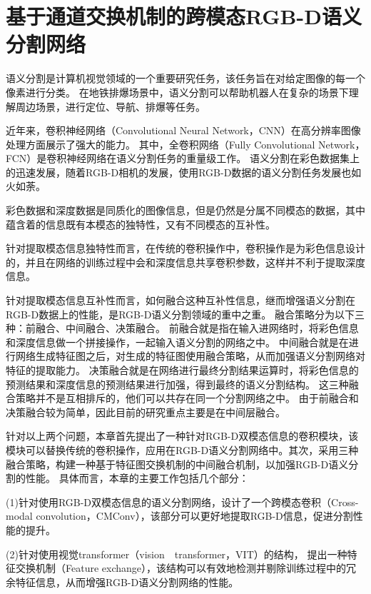 \chapter{基于通道交换机制的跨模态RGB-D语义分割网络}
语义分割是计算机视觉领域的一个重要研究任务，该任务旨在对给定图像的每一个像素进行分类。
在地铁排爆场景中，语义分割可以帮助机器人在复杂的场景下理解周边场景，进行定位、导航、排爆等任务。

近年来，卷积神经网络（Convolutional Neural Network，CNN）在高分辨率图像处理方面展示了强大的能力。
其中，全卷积网络（Fully Convolutional Network，FCN）是卷积神经网络在语义分割任务的重量级工作。
语义分割在彩色数据集上的迅速发展，随着RGB-D相机的发展，使用RGB-D数据的语义分割任务发展也如火如荼。

彩色数据和深度数据是同质化的图像信息，但是仍然是分属不同模态的数据，其中蕴含着的信息既有本模态的独特性，又有不同模态的互补性。

针对提取模态信息独特性而言，在传统的卷积操作中，卷积操作是为彩色信息设计的，并且在网络的训练过程中会和深度信息共享卷积参数，这样并不利于提取深度信息。

针对提取模态信息互补性而言，如何融合这种互补性信息，继而增强语义分割在RGB-D数据上的性能，是RGB-D语义分割领域的重中之重。
融合策略分为以下三种：前融合、中间融合、决策融合。
前融合就是指在输入进网络时，将彩色信息和深度信息做一个拼接操作，一起输入语义分割的网络之中。
中间融合就是在进行网络生成特征图之后，对生成的特征图使用融合策略，从而加强语义分割网络对特征的提取能力。
决策融合就是在网络进行最终分割结果运算时，将彩色信息的预测结果和深度信息的预测结果进行加强，得到最终的语义分割结构。
这三种融合策略并不是互相排斥的，他们可以共存在同一个分割网络之中。
由于前融合和决策融合较为简单，因此目前的研究重点主要是在中间层融合。

针对以上两个问题，本章首先提出了一种针对RGB-D双模态信息的卷积模块，该模块可以替换传统的卷积操作，应用在RGB-D语义分割网络中。其次，采用三种融合策略，构建一种基于特征图交换机制的中间融合机制，以加强RGB-D语义分割的性能。
具体而言，本章的主要工作包括几个部分：

(1)针对使用RGB-D双模态信息的语义分割网络，设计了一个跨模态卷积（Cross-modal convolution，CMConv），该部分可以更好地提取RGB-D信息，促进分割性能的提升。

(2)针对使用视觉transformer（vision　transformer，VIT）的结构，
提出一种特征交换机制（Feature exchange），该结构可以有效地检测并剔除训练过程中的冗余特征信息，从而增强RGB-D语义分割网络的性能。






